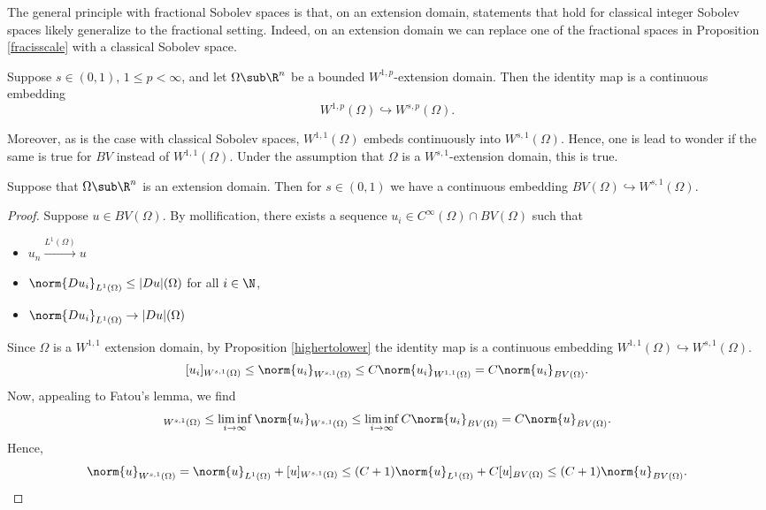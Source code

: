 \documentclass[../main.tex]{subfiles}
\begin{document}
The general principle with fractional Sobolev spaces is that, on an extension domain, statements that hold for classical integer Sobolev spaces likely generalize to the fractional setting. Indeed, on an extension domain we can replace one of the fractional spaces in Proposition \ref{fracisscale} with a classical Sobolev space.


\begin{proposition}\label{highertolower}
    Suppose $ s\in (0,1) $, $ 1\leq p <\infty $, and let $ \Omega\sub \R^{n} $ be a bounded $ W^{1,p} $-extension domain. Then the identity map is a continuous embedding 
    \[
        W^{1,p}(\Omega)\hookrightarrow W^{s,p}(\Omega).
    \]
\end{proposition}

 Moreover, as is the case with classical Sobolev spaces, $ W^{1,1}(\Omega) $ embeds continuously into $ W^{s,1}(\Omega) $. Hence, one is lead to wonder if the same is true for $ BV $ instead of $ W^{1,1}(\Omega) $. Under the assumption that $ \Omega $ is a $ W^{s,1} $-extension domain, this is true.


\begin{proposition}\label{BVinWs}
    Suppose that $ \Omega\sub \R^{n} $ is an extension domain. Then for $ s\in (0,1) $ we have a continuous embedding $ BV(\Omega)\hookrightarrow W^{s,1}(\Omega) $. 
\end{proposition}

\begin{proof}
    Suppose $ u\in BV(\Omega) $. By mollification, there exists a sequence $ u_{i}\in C^{\infty}(\Omega)\cap BV(\Omega) $ such that 
    \begin{itemize}
        \item $ u_{n}\xrightarrow{L^{1}(\Omega)}u $
        \item $ \norm{Du_{i}}_{L^{1}(\Omega)}  \leq |Du|(\Omega) $ for all $ i\in \N $,
        \item $ \norm{Du_{i}}_{L^{1}(\Omega)}\to |Du|(\Omega) $
    \end{itemize}
    Since $ \Omega $ is a $ W^{1,1} $ extension domain, by Proposition \ref{highertolower} the identity map is a continuous embedding $W^{1,1}(\Omega)\hookrightarrow W^{s,1}(\Omega) $.
    \[
        [u_{i}]_{W^{s,1}(\Omega)} \leq \norm{u_{i}}_{W^{s,1}(\Omega)} \leq C\norm{u_{i}}_{W^{1,1}(\Omega)} = C\norm{u_{i}}_{BV(\Omega)}.
    \]
    Now, appealing to Fatou's lemma, we find
    \begin{align*}
        [u]_{W^{s,1}(\Omega)} \leq \liminf_{i\to\infty} \norm{u_{i}}_{W^{s,1}(\Omega)} \leq \liminf_{i\to\infty} C \norm{u_{i}}_{BV(\Omega)} = C \norm{u}_{BV(\Omega)}.
    \end{align*}
    Hence, 
    \[
        \norm{u}_{W^{s,1}(\Omega)} = \norm{u}_{L^{1}(\Omega)}+ [u]_{W^{s,1}(\Omega)} \leq (C+1)\norm{u}_{L^{1}(\Omega)} +  C[u]_{BV(\Omega)} \leq (C+1)\norm{u}_{BV(\Omega)}.
    \]
\end{proof}
\end{document}
